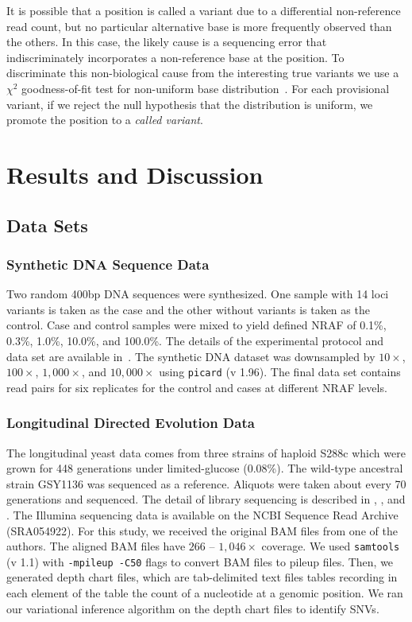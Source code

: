 \documentclass{bmcart}
\begin{document}
It is possible that a position is called a variant due to a differential non-reference read count, but no particular alternative base is more frequently observed than the others.
In this case, the likely cause is a sequencing error that indiscriminately incorporates a non-reference base at the position.
To discriminate this non-biological cause from the interesting true variants we use a $\chi^2$ goodness-of-fit test for non-uniform base distribution~\cite{efron2010large, he2015rvd2}.
For each provisional variant, if we reject the null hypothesis that the distribution is uniform, we promote the position to a \textit{called variant}.


\section{Results and Discussion}

\subsection{Data Sets}

\subsubsection{Synthetic DNA Sequence Data}

Two random 400bp DNA sequences were synthesized. One sample with 14 loci variants is taken as the case and the other without variants is taken as the control.
Case and control samples were mixed to yield defined NRAF of 0.1\%, 0.3\%, 1.0\%, 10.0\%, and 100.0\%.
The details of the experimental protocol and data set are available in~\cite{flaherty2011ultrasensitive}.
The synthetic DNA dataset was downsampled by $10\times$, $100\times$, $1,000\times$, and $10,000\times$ using \texttt{picard} (v 1.96).
The final data set contains read pairs for six replicates for the control and cases at different NRAF levels.

\subsubsection{Longitudinal Directed Evolution Data}

The longitudinal yeast data comes from three strains of haploid S288c which were grown for 448 generations under limited-glucose (0.08\%).
The wild-type ancestral strain GSY1136 was sequenced as a reference.
Aliquots were taken about every 70 generations and sequenced.
The detail of library sequencing is described in \cite{kvitek2013whole}, \cite{bansal2010statistical}, and \cite{kao2008molecular}.
The Illumina sequencing data is available on the NCBI Sequence Read Archive (SRA054922)\cite{kvitek2013whole}.
For this study, we received the original BAM files from one of the authors.
The aligned BAM files have $266$ -- $1,046\times$ coverage.
We used \texttt{samtools} (v 1.1) with \texttt{-mpileup -C50} flags to convert BAM files to pileup files.
Then, we generated depth chart files, which are tab-delimited text files tables recording in each element of the table the count of a nucleotide at a genomic position.
We ran our variational inference algorithm on the depth chart files to identify SNVs.
\end{document}
